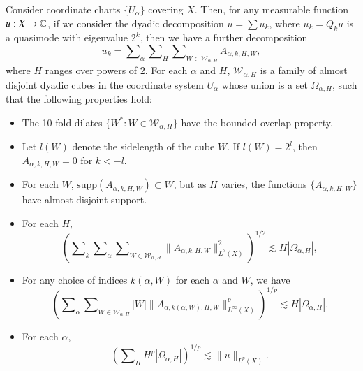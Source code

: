 \begin{lemma} \label{atomicdecompositionlemma}
    Consider coordinate charts $\{ U_\alpha \}$ covering $X$. Then, for any measurable function $u: X \to \operatorname{\mathbb{C}}$, if we consider the dyadic decomposition $u = \sum u_k$, where $u_k = Q_k u$ is a quasimode with eigenvalue $2^k$, then we have a further decomposition
    \[ u_k = \sum\nolimits_\alpha \sum\nolimits_H \sum\nolimits_{W \in \mathcal{W}_{\alpha,H}} A_{\alpha,k,H,W}, \]
    where $H$ ranges over powers of $2$. For each $\alpha$ and $H$, $\mathcal{W}_{\alpha,H}$ is a family of almost disjoint dyadic cubes in the coordinate system $U_\alpha$ whose union is a set $\Omega_{\alpha,H}$, such that the following properties hold:
    \begin{itemize}
        \item The 10-fold dilates $\{ W^* : W \in \mathcal{W}_{\alpha,H} \}$ have the bounded overlap property.

        \item Let $l(W)$ denote the sidelength of the cube $W$. If $l(W) = 2^l$, then $A_{\alpha,k,H,W} = 0$ for $k < -l$.

        \item For each $W$, $\text{supp}(A_{\alpha,k,H,W}) \subset W$, but as $H$ varies, the functions $\{ A_{\alpha,k,H,W} \}$ have almost disjoint support.

        \item For each $H$,
        \[ \left( \sum\nolimits_k \sum\nolimits_\alpha \sum\nolimits_{W \in \mathcal{W}_{\alpha,H}} \| A_{\alpha,k,H,W} \|_{L^2(X)}^2 \right)^{1/2} \lesssim H |\Omega_{\alpha,H}|, \]

        \item For any choice of indices $k(\alpha,W)$ for each $\alpha$ and $W$, we have
        \[ \left( \sum\nolimits_\alpha \sum\nolimits_{W \in \mathcal{W}_{\alpha,H}} |W| \| A_{\alpha,k(\alpha,W),H,W} \|_{L^\infty(X)}^p \right)^{1/p} \lesssim H |\Omega_{\alpha,H}|. \]

        \item For each $\alpha$,
        \[ \left( \sum\nolimits_H H^p |\Omega_{\alpha,H}| \right)^{1/p} \lesssim \| u \|_{L^p(X)}. \]
    \end{itemize}
\end{lemma}
